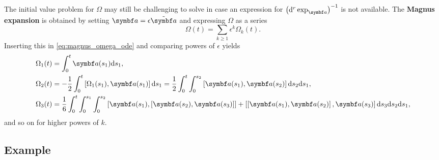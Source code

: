 The initial value problem for $\Omega$ may still be challenging to solve in case an expression for $\left(\mathrm{d}^r \exp_\a \right)^{-1}$ is not available. The \textbf{Magnus expansion} is obtained by setting $\a = \epsilon \tilde \a$ and expressing $\Omega$ as a series
\begin{equation}
  \Omega(t) = \sum_{k \geq 1} \epsilon^k \Omega_k(t).
\end{equation}
Inserting this in \eqref{eq:magnus_omega_ode} and comparing powers of $\epsilon$ yields
\begin{equation}
  \begin{aligned}
    \Omega_1(t) & = \int_0^t \a(s_1) \mathrm{d}s_1,                                                                                                                                                                                      \\
    \Omega_2(t) & = -\frac{1}{2} \int_0^t \left[ \Omega_1(s_1), \a(s_1) \right] \mathrm{d}s_1 = \frac{1}{2} \int_0^t \int_{0}^{s_2} \left[ \a(s_1), \a(s_2) \right] \mathrm{d} s_2 \mathrm{d} s_1,                                       \\
    \Omega_3(t) & = \frac{1}{6} \int_{0}^t \int_{0}^{s_1} \int_{0}^{s_2} \left[ \a(s_1), \left[ \a(s_2), \a(s_3) \right] \right] + \left[ \left[ \a(s_1), \a(s_2) \right], \a(s_3) \right] \mathrm{d} s_3 \mathrm{d} s_2 \mathrm{d} s_1,
  \end{aligned}
\end{equation}
and so on for higher powers of $k$.

\subsection{Example}

